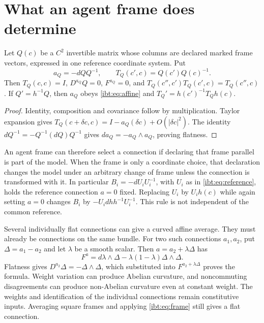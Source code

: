 \section{What an agent frame does determine}

Let $Q(c)$ be a $C^2$ invertible matrix whose columns are declared marked frame vectors, expressed in one reference coordinate system. Put
\begin{equation}
 a_Q=-d Q Q^{-1},\qquad
 T_Q(c',c)=Q(c')Q(c)^{-1}.
 \label{ibt:eq:frame}
\end{equation}
Then $T_Q(c,c)=I$, $D^{a_Q}Q=0$, $F^{a_Q}=0$, and
$T_Q(c'',c')T_Q(c',c)=T_Q(c'',c)$. If $Q'=h^{-1}Q$, then $a_Q$ obeys \cref{ibt:eq:affine} and $T_Q'=h(c')^{-1}T_Qh(c)$.
\begin{proof}
Identity, composition and covariance follow by multiplication. Taylor expansion gives $T_Q(c+\delta c,c)=I-a_Q(\delta c)+O(|\delta c|^2)$. The identity $d Q^{-1}=-Q^{-1}(d Q)Q^{-1}$ gives $d a_Q=-a_Q\wedge a_Q$, proving flatness.
\end{proof}

An agent frame can therefore select a connection if declaring that frame parallel is part of the model. When the frame is only a coordinate choice, that declaration changes the model under an arbitrary change of frame unless the connection is transformed with it. In particular $B_i=-d U_iU_i^{-1}$, with $U_i$ as in \cref{ibt:eq:reference}, holds the reference connection $a=0$ fixed. Replacing $U_i$ by $U_i h(c)$ while again setting $a=0$ changes $B_i$ by $-U_id h h^{-1}U_i^{-1}$. This rule is not independent of the common reference.

Several individually flat connections can give a curved affine average. They must already be connections on the same bundle. For two such connections $a_1,a_2$, put $\Delta=a_1-a_2$ and let $\lambda$ be a smooth scalar. Then $a=a_2+\lambda\Delta$ has
\begin{equation}
 F^a=d\lambda\wedge\Delta-\lambda(1-\lambda)\Delta\wedge\Delta.
 \label{ibt:eq:average-curvature}
\end{equation}
Flatness gives $D^{a_2}\Delta=-\Delta\wedge\Delta$, which substituted into $F^{a_2+\lambda\Delta}$ proves the formula. Weight variation can produce Abelian curvature, and noncommuting disagreements can produce non-Abelian curvature even at constant weight. The weights and identification of the individual connections remain constitutive inputs. Averaging square frames and applying \cref{ibt:eq:frame} still gives a flat connection.

